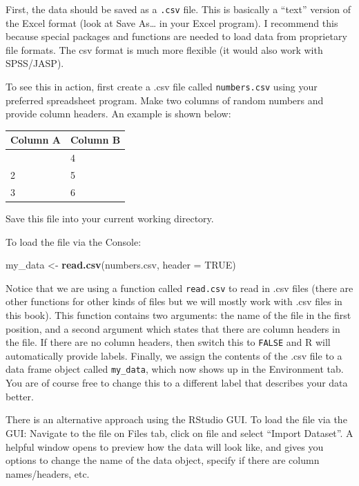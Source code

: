 \documentclass[
]{book}
\newenvironment{Shaded}{\begin{snugshade}}{\end{snugshade}}
\newcommand{\AttributeTok}[1]{\textcolor[rgb]{0.13,0.29,0.53}{#1}}
\newcommand{\ConstantTok}[1]{\textcolor[rgb]{0.56,0.35,0.01}{#1}}
\newcommand{\FunctionTok}[1]{\textcolor[rgb]{0.13,0.29,0.53}{\textbf{#1}}}
\newcommand{\NormalTok}[1]{#1}
\newcommand{\OtherTok}[1]{\textcolor[rgb]{0.56,0.35,0.01}{#1}}
\newcommand{\StringTok}[1]{\textcolor[rgb]{0.31,0.60,0.02}{#1}}
\begin{document}
First, the data should be saved as a \texttt{.csv} file. This is basically a ``text'' version of the Excel format (look at Save As\ldots{} in your Excel program). I recommend this because special packages and functions are needed to load data from proprietary file formats. The csv format is much more flexible (it would also work with SPSS/JASP).

To see this in action, first create a .csv file called \texttt{numbers.csv} using your preferred spreadsheet program. Make two columns of random numbers and provide column headers. An example is shown below:

\begin{longtable}[]{@{}ll@{}}
\toprule\noalign{}
Column A & Column B \\
\midrule\noalign{}
\endhead
\bottomrule\noalign{}
\endlastfoot
1 & 4 \\
2 & 5 \\
3 & 6 \\
\end{longtable}

Save this file into your current working directory.

To load the file via the Console:

\begin{Shaded}
\begin{Highlighting}[]
\NormalTok{my\_data }\OtherTok{\textless{}{-}} \FunctionTok{read.csv}\NormalTok{(}\StringTok{\textquotesingle{}numbers.csv\textquotesingle{}}\NormalTok{, }\AttributeTok{header =} \ConstantTok{TRUE}\NormalTok{)}
\end{Highlighting}
\end{Shaded}

Notice that we are using a function called \texttt{read.csv} to read in .csv files (there are other functions for other kinds of files but we will mostly work with .csv files in this book). This function contains two arguments: the name of the file in the first position, and a second argument which states that there are column headers in the file. If there are no column headers, then switch this to \texttt{FALSE} and R will automatically provide labels. Finally, we assign the contents of the .csv file to a data frame object called \texttt{my\_data}, which now shows up in the Environment tab. You are of course free to change this to a different label that describes your data better.

There is an alternative approach using the RStudio GUI. To load the file via the GUI: Navigate to the file on Files tab, click on file and select ``Import Dataset''. A helpful window opens to preview how the data will look like, and gives you options to change the name of the data object, specify if there are column names/headers, etc.
\end{document}
